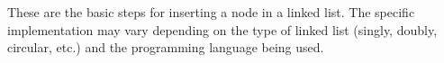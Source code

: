 \documentclass[preview]{standalone}
\begin{document}
These are the basic steps for inserting a node in a linked list. The specific implementation may vary depending on the type of linked list (singly, doubly, circular, etc.) and the programming language being used.\\
\end{document}
